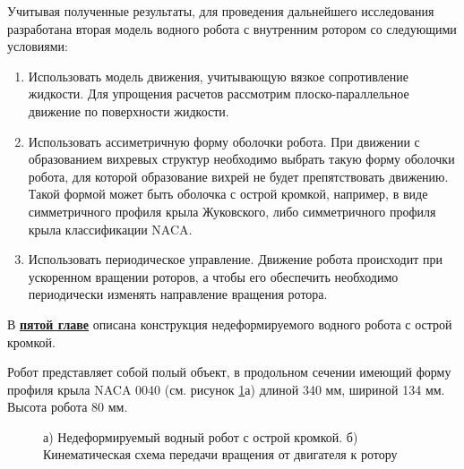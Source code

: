 Учитывая полученные результаты, для проведения дальнейшего исследования разработана вторая модель водного робота с внутренним ротором со следующими условиями:

\begin{enumerate}
	\item Использовать модель движения, учитывающую вязкое сопротивление жидкости.
	Для упрощения расчетов рассмотрим плоско-параллельное движение по поверхности жидкости.
	
	\item Использовать ассиметричную форму оболочки робота. При движении с образованием вихревых структур необходимо выбрать такую форму оболочки робота, для которой образование вихрей не будет препятствовать движению. Такой формой может быть оболочка с острой кромкой, например, в виде симметричного профиля крыла Жуковского, либо симметричного профиля крыла классификации NACA.
	
	\item Использовать периодическое управление. Движение робота происходит при ускоренном вращении роторов, а чтобы его обеспечить необходимо периодически изменять направление вращения ротора. 
	
\end{enumerate}






В \underline{\textbf{пятой главе}} описана конструкция недеформируемого водного робота с острой кромкой.

Робот представляет собой полый объект, в продольном сечении имеющий форму профиля крыла NACA 0040 (см. рисунок \ref{Photo_NACA}а) длиной 340 мм, шириной 134 мм. Высота робота 80 мм. 



\begin{figure}[h]
	\begin{minipage}[h]{0.5\linewidth}
	\end{minipage}
	\hfill
	\begin{minipage}[h]{0.5\linewidth}
	\end{minipage}
	
	\begin{minipage}[h]{0.5\linewidth}
	\end{minipage}
	\hfill
	\begin{minipage}[h]{0.5\linewidth}
	\end{minipage}
	\caption{а) Недеформируемый водный робот с острой кромкой. б) Кинематическая схема передачи вращения от двигателя к ротору}
	\label{Photo_NACA}
\end{figure}

